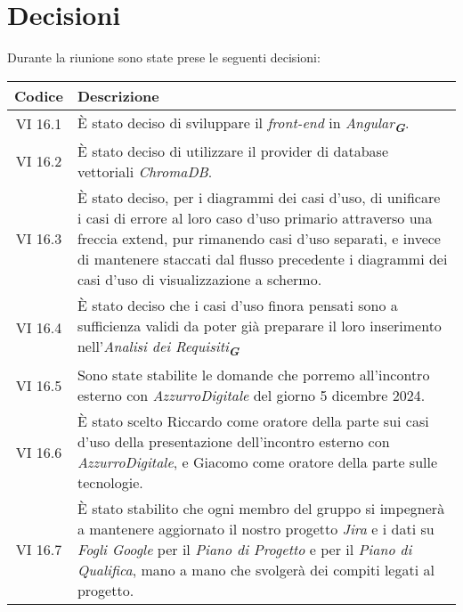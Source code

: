 
\section{Decisioni}

Durante la riunione sono state prese le seguenti decisioni:

\vspace{0.5cm}

\begin{table}[htbp]
    \centering
    \begin{tabular}{|c|p{}|}
        \hline
        \rowcolor[gray]{0.75}
        \textbf{Codice} & \textbf{Descrizione}\\
        \hline
        VI 16.1 & È stato deciso di sviluppare il \emph{front-end} in \emph{Angular}\textsubscript{\textit{\textbf{G}}}. \\
        \hline
        VI 16.2 & È stato deciso di utilizzare il provider di database vettoriali \emph{ChromaDB}. \\
        \hline
        VI 16.3 & È stato deciso, per i diagrammi dei casi d'uso, di unificare i casi di errore al loro caso d'uso primario attraverso una freccia extend,
        pur rimanendo casi d'uso separati, e invece di mantenere staccati dal flusso precedente i diagrammi dei casi d'uso di visualizzazione a schermo. \\
        \hline
        VI 16.4 & È stato deciso che i casi d'uso finora pensati sono a sufficienza validi da poter già preparare il loro inserimento nell'\emph{Analisi dei Requisiti}\textsubscript{\textit{\textbf{G}}} \\
        \hline
        VI 16.5 & Sono state stabilite le domande che porremo all'incontro esterno con \emph{AzzurroDigitale} del giorno 5 dicembre 2024. \\
        \hline
        VI 16.6 & È stato scelto Riccardo come oratore della parte sui casi d'uso della presentazione dell'incontro esterno con
        \emph{AzzurroDigitale}, e Giacomo come oratore della parte sulle tecnologie. \\
        \hline
        VI 16.7 & È stato stabilito che ogni membro del gruppo si impegnerà a mantenere aggiornato il nostro progetto \emph{Jira} e i dati su 
        \emph{Fogli Google} per il \emph{Piano di Progetto} e per il \emph{Piano di Qualifica}, mano a mano che svolgerà dei compiti legati al progetto. \\
        \hline
    \end{tabular}
\end{table}